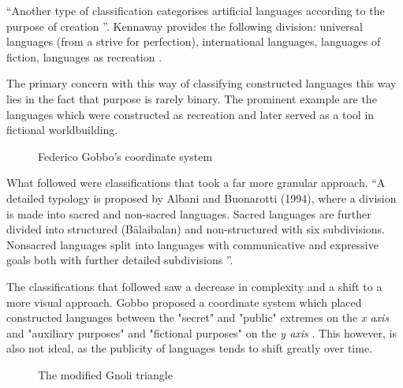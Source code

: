 \documentclass[14pt, a4paper]{extreport}
\begin{document}
``Another type of classification categorises artificial languages according to the purpose of creation \parencite[93]{stria}''. Kennaway provides the following division: universal languages (from a strive for perfection), international languages, languages of fiction, languages as recreation \parencite{kennaway}.

The primary concern with this way of classifying constructed languages this way lies in the fact that purpose is rarely binary. The prominent example are the languages which were constructed as recreation and later served as a tool in fictional worldbuilding.

\begin{figure}[ht]%
  \bigskip
  \centering
  \caption{Federico Gobbo's coordinate system}
\end{figure}%

What followed were classifications that took a far more granular approach. ``A detailed typology is proposed by Albani and Buonarotti (1994), where a division is made into sacred and non-sacred languages. Sacred languages are further divided into structured (Bālaibalan) and non-structured with six subdivisions. Nonsacred languages split into languages with communicative and expressive goals both with further detailed subdivisions \parencite[93]{stria}''.

The classifications that followed saw a decrease in complexity and a shift to a more visual approach. Gobbo proposed a coordinate system which placed constructed languages between the "secret" and "public" extremes on the \textit{x axis} and "auxiliary purposes" and "fictional purposes" on the \textit{y axis} \parencite{gobbo}. This however, is also not ideal, as the publicity of languages tends to shift greatly over time.

\begin{figure}[ht]%
  \bigskip
  \centering
  \caption{The modified Gnoli triangle}
\end{figure}%
\end{document}
